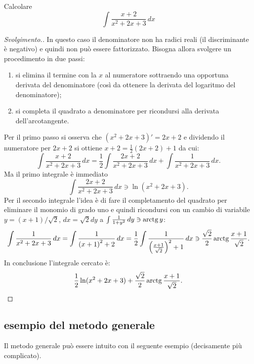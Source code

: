 \begin{example}
Calcolare 
\[
 \int \frac{x+2}{x^2+2x+3}\, dx
\]
\end{example}
\begin{proof}[Svolgimento.]
In questo caso il denominatore non ha radici reali (il discriminante è negativo) e quindi non può 
essere fattorizzato.
Bisogna allora svolgere un procedimento in due passi: 
\begin{enumerate}
  \item si elimina il termine con la $x$ al numeratore sottraendo 
  una opportuna derivata del denominatore (così da ottenere la derivata 
  del logaritmo del denominatore);
  \item si completa il quadrato a denominatore per ricondursi alla 
  derivata dell'arcotangente. 
\end{enumerate} 
Per il primo passo si osserva che $(x^2+2x+3)' = 2x+2$ e dividendo il numeratore 
per $2x+2$ si ottiene $x+2 = \frac 1 2 (2x+2) + 1$ da cui:
\[
\int \frac{x+2}{x^2+2x+3} \, dx
= \frac 1 2 \int \frac{2x + 2}{x^2+2x+3}\, dx + \int \frac{1}{x^2+2x+3}\, dx. 
\]
Ma il primo integrale è immediato 
\[
\int \frac{2x+2}{x^2+2x+3}\, dx \ni \ln (x^2+2x+3).
\]
Per il secondo integrale l'idea è di fare il completamento 
del quadrato per eliminare il monomio di grado uno e quindi 
ricondursi con un cambio di variabile 
$y=(x+1)/\sqrt 2$, $dx = \sqrt 2 dy$ 
a $\int \frac{1}{1+y^2}\, dy\ni \operatorname{arctg} y$:
\[
  \int \frac{1}{x^2+2x+3}\, dx 
  = \int \frac{1}{{\left( x+1 \right)}^2 + 2}\, dx 
  = \frac 1 2 \int \frac{1}{{\left( \frac{x+1}{\sqrt 2} \right)}^2+1}\, dx 
  \ni \frac{\sqrt 2}{2} \operatorname{arctg} \frac{x+1}{\sqrt 2}.
\]
In conclusione l'integrale cercato è:
\[
  \frac 1 2 \ln (x^2+2x+3) + \frac{\sqrt 2}{2} \operatorname{arctg} \frac{x+1}{\sqrt 2}.
\]
\end{proof}

\subsection{esempio del metodo generale}

Il metodo generale può essere intuito con il seguente 
esempio (decisamente più complicato).


